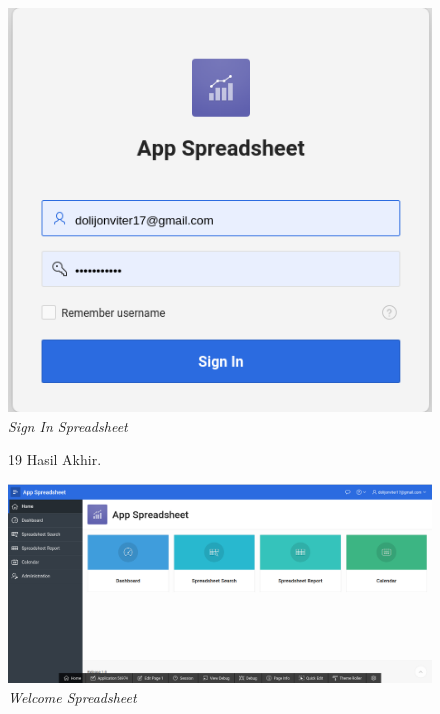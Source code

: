 \begin{enumerate}
\begin{figure}
    \begin{center}
\includegraphics[scale=0.4]{figures/tampilLogin.png}
    \caption{\textit{Sign In Spreadsheet}}
        \end{center}
\label{gambar}
\end{figure}

\begin{figure}
\item[19]Hasil Akhir.

    \begin{center}
\includegraphics[scale=0.3]{figures/hasilAkhir.png}
    \caption{\textit{Welcome Spreadsheet}}
        \end{center}
\label{gambar}
\end{figure}

\end{enumerate}
